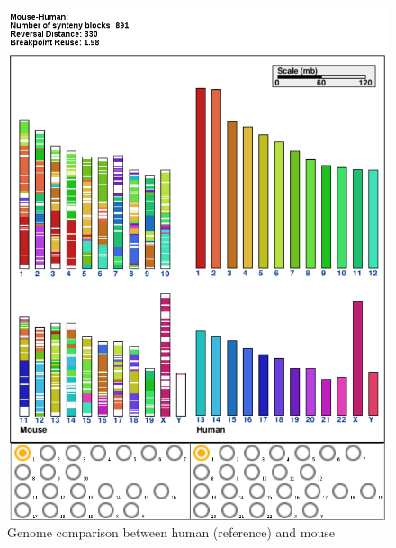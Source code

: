 \documentclass[]{article}
\theoremstyle{definition}
\begin{document}
\begin{figure}[h!]
	\centering
	\includegraphics*[height = 0.7\textheight]{../human_mouse.png}
	\caption{\label{h_m} Genome comparison between human (reference) and mouse }
\end{figure}
\end{document}
